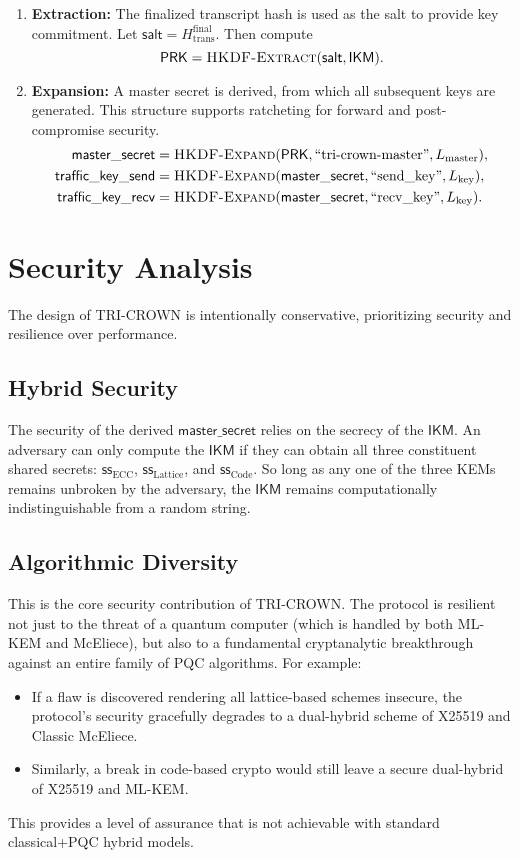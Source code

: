 \documentclass[11pt]{article}
\begin{document}
\begin{enumerate}
    \item \textbf{Extraction:} The finalized transcript hash is used as the salt to provide key commitment. Let $\mathsf{salt} = H_{\text{trans}}^{\text{final}}$. Then compute
    \[
        \mathsf{PRK} = \textsc{HKDF-Extract}(\mathsf{salt}, \mathsf{IKM}).
    \]
    \item \textbf{Expansion:} A master secret is derived, from which all subsequent keys are generated. This structure supports ratcheting for forward and post-compromise security.
    \begin{align*}
        \mathsf{master\_secret} &= \textsc{HKDF-Expand}(\mathsf{PRK}, \text{``tri-crown-master''}, L_{\text{master}}), \\
        \mathsf{traffic\_key\_send} &= \textsc{HKDF-Expand}(\mathsf{master\_secret}, \text{``send\_key''}, L_{\text{key}}), \\
        \mathsf{traffic\_key\_recv} &= \textsc{HKDF-Expand}(\mathsf{master\_secret}, \text{``recv\_key''}, L_{\text{key}}).
    \end{align*}
\end{enumerate}

\section{Security Analysis}
The design of TRI-CROWN is intentionally conservative, prioritizing security and resilience over performance.

\subsection{Hybrid Security}
The security of the derived $\mathsf{master\_secret}$ relies on the secrecy of the $\mathsf{IKM}$. An adversary can only compute the $\mathsf{IKM}$ if they can obtain all three constituent shared secrets: $\mathsf{ss}_{\mathrm{ECC}}$, $\mathsf{ss}_{\mathrm{Lattice}}$, and $\mathsf{ss}_{\mathrm{Code}}$. So long as any one of the three KEMs remains unbroken by the adversary, the $\mathsf{IKM}$ remains computationally indistinguishable from a random string.

\subsection{Algorithmic Diversity}
This is the core security contribution of TRI-CROWN. The protocol is resilient not just to the threat of a quantum computer (which is handled by both ML-KEM and McEliece), but also to a fundamental cryptanalytic breakthrough against an entire family of PQC algorithms. For example:
\begin{itemize}
    \item If a flaw is discovered rendering all lattice-based schemes insecure, the protocol's security gracefully degrades to a dual-hybrid scheme of X25519 and Classic McEliece.
    \item Similarly, a break in code-based crypto would still leave a secure dual-hybrid of X25519 and ML-KEM.
\end{itemize}
This provides a level of assurance that is not achievable with standard classical+PQC hybrid models.
\end{document}
